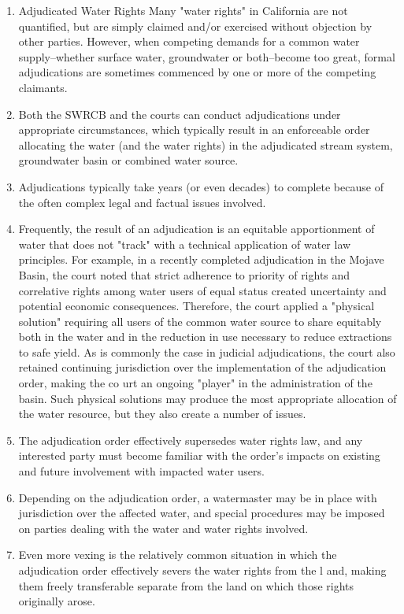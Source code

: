 \documentclass{article}
\begin{document}
\begin{enumerate}
\begin{itemize}
\begin{enumerate}
\item Adjudicated Water Rights Many "water rights" in California are not quantified, but are simply claimed and/or exercised without objection by other parties. However, when competing demands for a common water supply--whether surface water, groundwater or both--become too great, formal adjudications are sometimes commenced by one or more of the competing claimants. 
\item Both the SWRCB and the courts can conduct adjudications under appropriate circumstances, which typically result in an enforceable order allocating the water (and the water rights) in the adjudicated stream system, groundwater basin or combined water source. 
\item Adjudications typically take years (or even decades) to complete because of the often complex legal and factual issues involved. 
\item Frequently, the result of an adjudication is an equitable apportionment of water that does not "track" with a technical application of water law principles. For example, in a recently completed adjudication in the Mojave Basin, the court noted that strict adherence to priority of rights and correlative rights among water users of equal status created uncertainty and potential economic consequences. Therefore, the court applied a "physical solution" requiring all users of the common water source to share equitably both in the water and in the reduction in use necessary to reduce extractions to safe yield. As is commonly the case in judicial adjudications, the court also retained continuing jurisdiction over the implementation of the adjudication order, making the co urt an ongoing "player" in the administration of the basin. Such physical solutions may produce the most appropriate allocation of the water resource, but they also create a number of issues. 
\item The adjudication order effectively supersedes water rights law, and any interested party must become familiar with the order's impacts on existing and future involvement with impacted water users. 
\item Depending on the adjudication order, a watermaster may be in place with jurisdiction over the affected water, and special procedures may be imposed on parties dealing with the water and water rights involved. 
\item Even more vexing is the relatively common situation in which the adjudication order effectively severs the water rights from the l and, making them freely transferable separate from the land on which those rights originally arose. 

\end{enumerate}
\end{itemize}
\end{enumerate}
\end{document}
